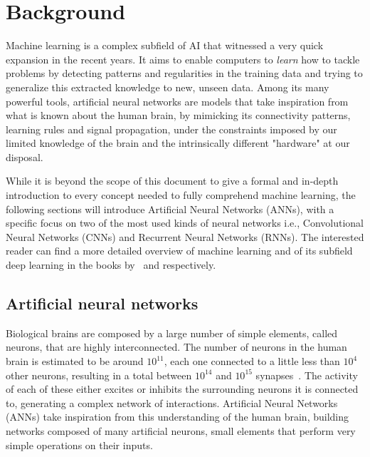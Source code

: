 \chapter{Background}\label{sec:background}

Machine learning is a complex subfield of AI that witnessed a very quick
expansion in the recent years. It aims to enable computers to \emph{learn} how
to tackle problems by detecting patterns and regularities in the training data
and trying to generalize this extracted knowledge to new, unseen data.
Among its many powerful tools, artificial neural networks are models that take
inspiration from what is known about the human brain, by mimicking its
connectivity patterns, learning rules and signal propagation, under the
constraints imposed by our limited knowledge of the brain and the intrinsically
different "hardware" at our disposal.

While it is beyond the scope of this document to give a formal and in-depth
introduction to every concept needed to fully comprehend machine learning,
the following sections will introduce Artificial Neural Networks (ANNs), with a
specific focus on two of the most used kinds of neural networks i.e.,
Convolutional Neural Networks (CNNs) and Recurrent Neural Networks (RNNs). The
interested reader can find a more detailed overview of machine learning and of
its subfield deep learning in the books by~\cite{bishop-book2006} and
\cite{Goodfellow-et-al-2016-Book} respectively.

\section{Artificial neural networks}\label{sec:NN}
Biological brains are composed by a large number of simple elements, called
neurons, that are highly interconnected. The number of neurons in the human
brain is estimated to be around $10^{11}$, each one connected to a little less
than $10^{4}$ other neurons, resulting in a total between $10^{14}$ and
$10^{15}$ synapses~\citep{drachman2005we}. The activity of each of these either
excites or inhibits the surrounding neurons it is connected to, generating a
complex network of interactions. Artificial Neural Networks (ANNs) take
inspiration from this understanding of the human brain, building networks
composed of many artificial neurons, small elements that perform very simple
operations on their inputs.

